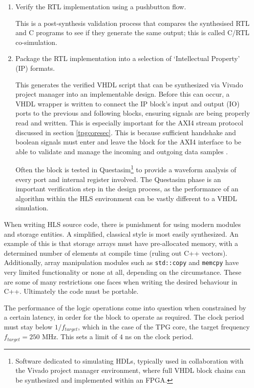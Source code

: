 \documentclass[10pt]{article}
\begin{document}
\begin{enumerate}
	\item Verify the RTL implementation using a pushbutton flow.
	
	 This is a post-synthesis validation process that compares the synthesised RTL and C programs to see if they generate the same output; this is called C/RTL co-simulation.
	
	\item Package the RTL implementation into a selection of `Intellectual Property' (IP) formats.
	
	This generates the verified VHDL script that can be synthesized via Vivado project manager into an implementable design. Before this can occur, a VHDL wrapper is written to connect the IP block's input and output (IO) ports to the previous and following blocks, ensuring signals are being properly read and written. This is especially important for the AXI4 stream protocol discussed in section \ref{tpgcoresec}. This is because sufficient handshake and boolean signals must enter and leave the block for the AXI4 interface to be able to validate and manage the incoming and outgoing data samples \cite{vivado_design_suite_user_guide_2018}.
	
	Often the block is tested in Questasim\footnote{Software dedicated to simulating HDLs, typically used in collaboration with the Vivado project manager environment, where full VHDL block chains can be synthesized and implemented within an FPGA.} to provide a waveform analysis of every port and internal register involved. The Questasim phase is an important verification step in the design process, as the performance of an algorithm within the HLS environment can be vastly different to a VHDL simulation.
\end{enumerate}

When writing HLS source code, there is punishment for using modern modules and storage entities. A simplified, classical style is most easily synthesized. An example of this is that storage arrays must have pre-allocated memory, with a determined number of elements at compile time (ruling out C++ vectors). Additionally, array manipulation modules such as \texttt{std::copy} and \texttt{memcpy} have very limited functionality or none at all, depending on the circumstance. These are some of many restrictions one faces when writing the desired behaviour in C++. Ultimately the code must be portable.

The performance of the logic operations come into question when constrained by a certain latency, in order for the block to operate as required. The clock period must stay below $1/f_{target}$, which in the case of the TPG core, the target frequency $f_{target} = 250$ MHz. This sets a limit of $4$ ns on the clock period.
\end{document}

